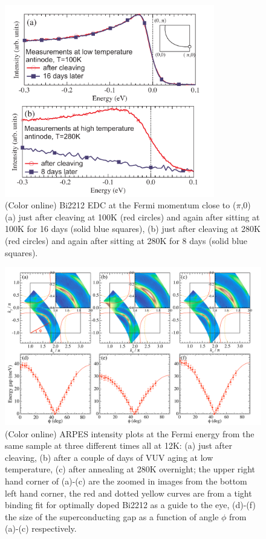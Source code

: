 \documentclass[aps,twocolumn,amsmath,amssymb,showpacs,prb,
superscriptaddress,unsortedaddress]{revtex4}
\begin{document}
\begin{figure}
\includegraphics[width=3.6in]{fig6.pdf}
\caption{(Color online) Bi2212 EDC at the Fermi momentum close to
($\pi$,0) (a) just after cleaving at 100K (red circles) and again
after sitting at 100K for 16 days (solid blue squares), (b) just after
cleaving at 280K (red circles) and again after sitting at 280K for 8
days (solid blue squares).}
\label{Fig. 5}
\end{figure}


\begin{figure}
\includegraphics[width=6 in]{fig7.pdf}
\caption{(Color online) ARPES intensity plots at the Fermi energy from
the same sample at three different times all at 12K: (a) just after
cleaving, (b) after a couple of days of VUV aging at low temperature,
(c) after annealing at 280K overnight; the upper right hand corner of
(a)-(c) are the zoomed in images from the bottom left hand corner, the
red and dotted yellow curves are from a tight binding fit for
optimally doped Bi2212 as a guide to the eye, (d)-(f) the size of the
superconducting gap as a function of angle $\phi$ from (a)-(c)
respectively.}
\label{Fig. 6}
\end{figure}
\end{document}
